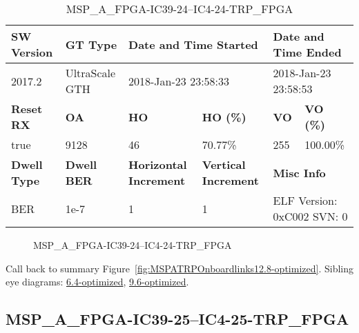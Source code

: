 \begin{table}[h]
\centering
\caption{MSP\_A\_FPGA-IC39-24--IC4-24-TRP\_FPGA}
\label{tab:MSPAFPGAIC3924IC424TRPFPGA12.8-optimized}
\begin{tabular}{@{}|l|l|l|l|l|l|@{}}
\toprule
\textbf{SW Version}                & \textbf{GT Type}   & \multicolumn{2}{l|}{\textbf{Date and Time Started}}            & \multicolumn{2}{l|}{\textbf{Date and Time Ended}}        \\ \midrule
2017.2                       & UltraScale GTH          & \multicolumn{2}{l|}{2018-Jan-23 23:58:33}                   & \multicolumn{2}{l|}{2018-Jan-23 23:58:53}               \\ \midrule
\textbf{Reset RX}                  & \textbf{OA} & \textbf{HO}   & \textbf{HO (\%)} & \textbf{VO} & \textbf{VO (\%)} \\ \midrule
true & 9128        & 46          & 70.77\%        & 255        & 100.00\%       \\ \midrule
\textbf{Dwell Type}                & \textbf{Dwell BER} & \textbf{Horizontal Increment} & \textbf{Vertical Increment}    & \multicolumn{2}{l|}{\textbf{Misc Info}}                  \\ \midrule
BER                            & 1e-7        & 1        & 1           & \multicolumn{2}{l|}{ELF Version: 0xC002 SVN: 0}                         \\ \bottomrule
\end{tabular}
\end{table}

\begin{figure}[h]
\caption{MSP\_A\_FPGA-IC39-24--IC4-24-TRP\_FPGA} \label{fig:MSPAFPGAIC3924IC424TRPFPGA12.8-optimized}
\end{figure}

Call back to summary Figure~\ref{fig:MSPATRPOnboardlinks12.8-optimized}.
Sibling eye diagrams: \hyperref[sec:MSPAFPGAIC3924IC424TRPFPGA6.4-optimized]{6.4-optimized}, \hyperref[sec:MSPAFPGAIC3924IC424TRPFPGA9.6-optimized]{9.6-optimized}.

\clearpage
\newpage


\subsection{MSP\_A\_FPGA-IC39-25--IC4-25-TRP\_FPGA}\label{sec:MSPAFPGAIC3925IC425TRPFPGA12.8-optimized}

